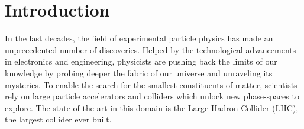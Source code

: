 \chapter*{Introduction}
\label{chap:0-4-introduction}

  In the last decades, the field of experimental particle physics has made an unprecedented number of discoveries. Helped by the technological advancements in electronics and engineering, physicists are pushing back the limits of our knowledge by probing deeper the fabric of our universe and unraveling its mysteries. To enable the search for the smallest constituents of matter, scientists rely on large particle accelerators and colliders which unlock new phase-spaces to explore. The state of the art in this domain is the Large Hadron Collider (LHC), the largest collider ever built.   
